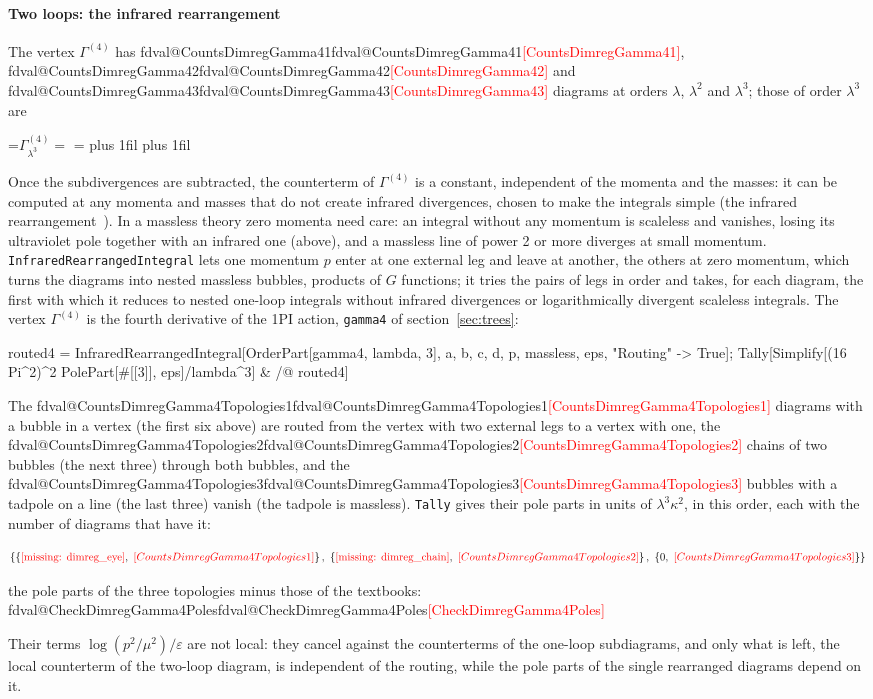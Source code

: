 \documentclass[11pt,a4paper]{article}
\makeatletter
\newcommand{\formula}[1]{\IfFileExists{figures/formula_#1.tex}{}{\text{\textcolor{red}{[missing: \detokenize{#1}]}}}}
\newcommand{\pkg}[1]{\texttt{#1}}
\newcommand{\inputfigure}[1]{\IfFileExists{figures/#1.tex}{}{\textcolor{red}{[missing: \detokenize{#1}]}}}
\newcommand{\val}[1]{\ifcsname fdval@#1\endcsname\csname fdval@#1\endcsname\else\textcolor{red}{[#1]}\fi}
\newcommand{\outval}[2][]{\val{#2}}
\newcommand{\diagramparagraph}{\rightskip=0pt plus 1fil \parfillskip=0pt plus 1fil
  \baselineskip=0pt \lineskiplimit=7pt \lineskip=7pt}
\newenvironment{diagramsum}[1]{%
  \par\nopagebreak\medskip\noindent
  \setbox0=\hbox{$\displaystyle #1 = {}$}%
  \hangindent=\wd0 \hangafter=1 \diagramparagraph
  \box0\ignorespaces}%
 {\par\vspace{9pt plus 3pt minus 2pt}}
\newcommand{\figuresum}[3][]{\begin{diagramsum}{#2}\inputfigure{#3}#1\end{diagramsum}}
\makeatother
\begin{document}
\paragraph{Two loops: the infrared rearrangement} The vertex $\Gamma^{(4)}$ has \val{CountsDimregGamma41}, \val{CountsDimregGamma42} and \val{CountsDimregGamma43} diagrams at
orders $\lambda$, $\lambda^2$ and $\lambda^3$; those of order $\lambda^3$ are
\figuresum{\Gamma^{(4)}_{\lambda^3}}{dimreg_gamma4_3}
Once the subdivergences are subtracted, the counterterm of $\Gamma^{(4)}$ is a constant, independent of the momenta and the
masses: it can be computed at any momenta and masses that do not create infrared divergences, chosen to make the integrals
simple (the infrared rearrangement~\cite{Vladimirov1980,ChetyrkinTkachov1981,KleinertSchulteFrohlinde2001}). In a massless
theory zero momenta need care: an integral without any momentum is scaleless and vanishes, losing its ultraviolet pole
together with an infrared one (above), and a massless line of power 2 or more diverges at small momentum.
\pkg{InfraredRearrangedIntegral} lets one momentum $p$ enter at one external leg and leave at another, the others at zero
momentum, which turns the diagrams into nested massless bubbles, products of $G$ functions; it tries the pairs of legs in
order and takes, for each diagram, the first with which it reduces to nested one-loop integrals without infrared
divergences or logarithmically divergent scaleless integrals. The vertex $\Gamma^{(4)}$ is the fourth derivative of the
1PI action, \pkg{gamma4} of section~\ref{sec:trees}:
\begin{code}
routed4 = InfraredRearrangedIntegral[OrderPart[gamma4, lambda, 3],
    {a, b, c, d}, p, massless, eps, "Routing" -> True];
Tally[Simplify[(16 Pi^2)^2 PolePart[#[[3]], eps]/lambda^3] & /@ routed4]
\end{code}
The \val{CountsDimregGamma4Topologies1} diagrams with a bubble in a vertex (the first six above) are routed from the vertex
with two external legs to a vertex with one, the \val{CountsDimregGamma4Topologies2} chains of two bubbles (the next three)
through both bubbles, and the \val{CountsDimregGamma4Topologies3} bubbles with a tadpole on a line (the last three) vanish
(the tadpole is massless). \pkg{Tally} gives their pole parts in units of $\lambda^3\kappa^2$, in this order, each with
the number of diagrams that have it:
\begin{outputbox}
\[
\left\{\left\{\formula{dimreg_eye},\ \outval{CountsDimregGamma4Topologies1}\right\},\
\left\{\formula{dimreg_chain},\ \outval{CountsDimregGamma4Topologies2}\right\},\ \{0,\ \outval{CountsDimregGamma4Topologies3}\}\right\}
\]
\end{outputbox}
\begin{result}
the pole parts of the three topologies minus those of the textbooks: \val{CheckDimregGamma4Poles}
\end{result}
Their terms $\log(p^2/\mu^2)/\varepsilon$ are not local: they cancel against the counterterms of the one-loop subdiagrams,
and only what is left, the local counterterm of the two-loop diagram, is independent of the routing, while the pole
parts of the single rearranged diagrams depend on it.
\end{document}
